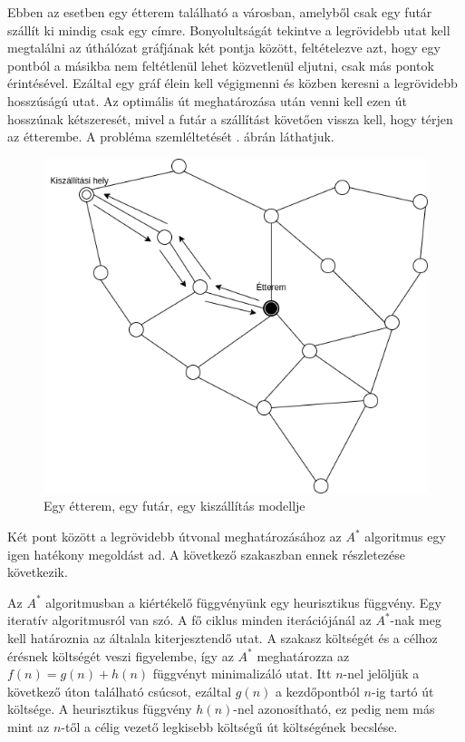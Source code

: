 

Ebben az esetben egy étterem található a városban, amelyből csak egy futár szállít ki mindig csak egy címre.
Bonyolultságát tekintve a legrövidebb utat kell megtalálni az úthálózat gráfjának két pontja között, feltételezve azt, hogy egy pontból a másikba nem feltétlenül lehet közvetlenül eljutni, csak más pontok érintésével. Ezáltal egy gráf élein kell végigmenni és közben keresni a legrövidebb hosszúságú utat. Az optimális út meghatározása után venni kell ezen út hosszúnak kétszeresét, mivel a futár a szállítást követően vissza kell, hogy térjen az étterembe.
A probléma szemléltetését . ábrán láthatjuk.\cite{Diagrams.net}

\begin{figure}[h!]
\centering
\includegraphics[scale=0.5]{images/Astar.png}
\caption{Egy étterem, egy futár, egy kiszállítás modellje}
\label{fig:model1}
\end{figure}

Két pont között a legrövidebb útvonal meghatározásához az $A^{*}$ algoritmus egy igen hatékony megoldást ad.\cite{Astar}
A következő szakaszban ennek részletezése következik.


Az $A^{*}$ algoritmusban a kiértékelő függvényünk egy heurisztikus függvény.
Egy iteratív algoritmusról van szó.
A fő ciklus minden iterációjánál az $A^{*}$-nak meg kell határoznia az általala kiterjesztendő utat.
A szakasz költségét és a célhoz érésnek költségét veszi figyelembe, így az $A^{*}$ meghatározza az $f(n) = g(n) + h(n)$ függvényt minimalizáló utat. Itt $n$-nel jelöljük a következő úton található csúcsot, ezáltal $g(n)$ a kezdőpontból $n$-ig tartó út költsége. A heurisztikus függvény $h(n)$-nel azonosítható, ez pedig nem más mint az $n$-től a célig vezető legkisebb költségű út költségének becslése.

